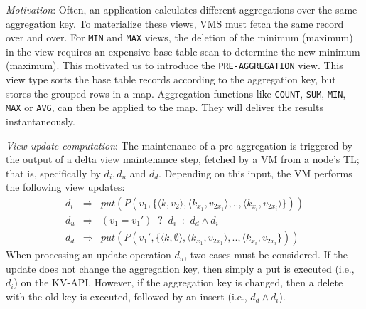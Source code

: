 \noindent  
\textit{Motivation}: Often, an application calculates different
aggregations over the same aggregation key.  To materialize these
views, VMS must fetch the same record over and over. For \texttt{MIN}
and \texttt{MAX} views, the deletion of the minimum (maximum) in the
view requires an expensive base table scan to determine the new
minimum (maximum).  This motivated us to introduce the
\texttt{PRE-AGGREGATION} view. This view type sorts the base table
records according to the aggregation key, but stores the grouped rows
in a map.
%
Aggregation functions like \texttt{COUNT}, \texttt{SUM}, \texttt{MIN},
\texttt{MAX} or \texttt{AVG}, can then be applied to the map. They 
 will deliver the results instantaneously.
%

\noindent  
\textit{View update computation}: The maintenance of a
pre-aggregation is triggered by the output of a delta view maintenance
step, fetched by a VM from a node's TL; that is, specifically by $d_i,
d_u$ and $d_d$.  Depending on this input, the VM performs the
following view updates:
%
\begin{eqnarray}
	d_i & \Rightarrow & put(P(v_1,\{\langle k,v_2\rangle, \langle k_{x_1},v_{2x_1}\rangle,..,\langle k_{x_i},v_{2x_i}\rangle\}))\\
	d_u & \Rightarrow & (v_1 = v_1')  \;\; \texttt{?} \;\; d_i \;\; \texttt{:} \;\; d_d \land d_i\\ 
	d_d & \Rightarrow & put(P(v_1',\{\langle k,\emptyset\rangle, \langle k_{x_1},v_{2x_1}\rangle,..,\langle k_{x_i},v_{2x_i}\}))
\end{eqnarray}
%
When processing an update operation $d_u$, two cases must be
considered.  If the update does not change the aggregation key, then
simply a put is executed (i.e., $d_i$) on the KV-API. However, if the aggregation
key is changed, then a delete with the old key is executed, followed
by an insert (i.e., $d_d \land d_i$).
%

